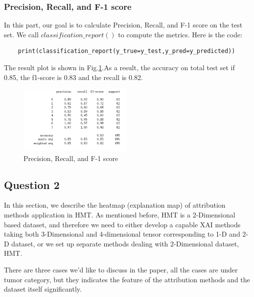 \documentclass[conference]{IEEEtran}
\begin{document}
\subsubsection{Precision, Recall, and F-1 score}
In this part, our goal is to calculate Precision, Recall, and F-1 score on the test set. We call $classification\_report()$ to compute the metrics. Here is the code:
\begin{lstlisting}
    print(classification_report(y_true=y_test,y_pred=y_predicted))
\end{lstlisting}
The result plot is shown in Fig.\ref{Fig.t3q1d}.As a result, the accuracy on total test set if 0.85, the f1-score is 0.83 and the recall is 0.82.
\begin{figure}[h] 
    \centering
    \includegraphics[width=0.5\textwidth]{./graphs/T3Q1d.png}
    \caption{Precision, Recall, and F-1 score} 
    \label{Fig.t3q1d} 
\end{figure}

\subsection{Question 2}

In this section, we describe the heatmap (explanation map) of attribution methods application in HMT. As mentioned before, HMT is a 2-Dimensional based dataset, and therefore we need to either develop a capable XAI methods taking both 3-Dimensional and 4-dimensional tensor corresponding to 1-D and 2-D dataset, or we set up separate methods dealing with 2-Dimensional dataset, HMT.

There are three cases we'd like to discuss in the paper, all the cases are under tumor category, but they indicates the feature of the attribution methods and the dataset itself significantly.
\end{document}
